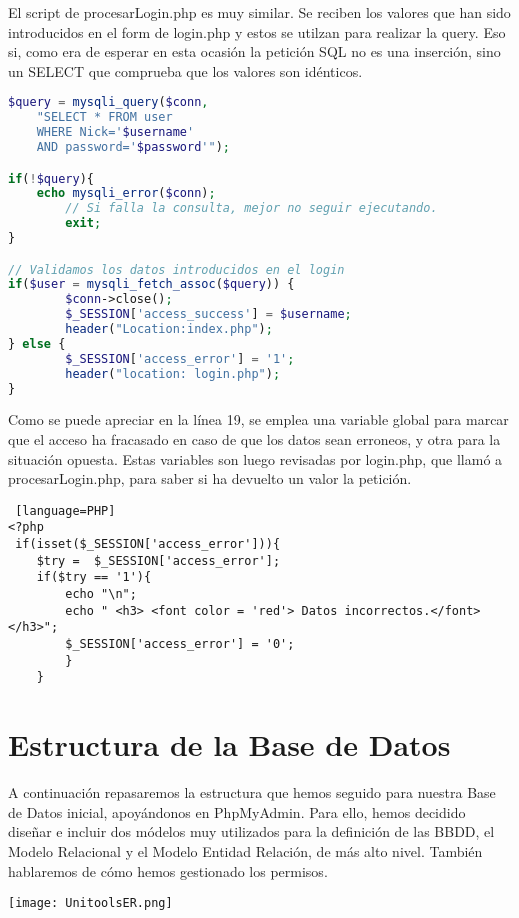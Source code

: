 \documentclass[12pt]{report}
\begin{document}
El script de procesarLogin.php es muy similar. Se reciben los valores que han sido introducidos en el form de login.php y estos se utilzan para realizar la query. Eso si, como era de esperar en esta ocasión la petición SQL no es una inserción, sino un SELECT que comprueba que los valores son idénticos.
\newline
\begin{lstlisting}[language=PHP]
$query = mysqli_query($conn, 
    "SELECT * FROM user 
    WHERE Nick='$username' 
    AND password='$password'");

if(!$query){ 
    echo mysqli_error($conn);
        // Si falla la consulta, mejor no seguir ejecutando.
        exit;
} 

// Validamos los datos introducidos en el login
if($user = mysqli_fetch_assoc($query)) {
        $conn->close();
        $_SESSION['access_success'] = $username;
        header("Location:index.php");
} else {
        $_SESSION['access_error'] = '1';
        header("location: login.php");
}
\end{lstlisting}

Como se puede apreciar en la línea 19, se emplea una variable global para marcar que el acceso ha fracasado en caso de que los datos sean erroneos, y otra para la situación opuesta. Estas variables son luego revisadas por login.php, que llamó a procesarLogin.php, para saber si ha devuelto un valor la petición.
\newline
\begin{lstlisting} [language=PHP]
<?php
 if(isset($_SESSION['access_error'])){
    $try =  $_SESSION['access_error'];
    if($try == '1'){
        echo "\n";
        echo " <h3> <font color = 'red'> Datos incorrectos.</font> </h3>";
        $_SESSION['access_error'] = '0';
        }
    }
\end{lstlisting}

\newpage
\section{Estructura de la Base de Datos}
A continuación repasaremos la estructura que hemos seguido para nuestra Base de Datos inicial, apoyándonos en PhpMyAdmin. Para ello, hemos decidido diseñar e incluir dos módelos muy utilizados para la definición de las BBDD, el Modelo Relacional y el Modelo Entidad Relación, de más alto nivel. También hablaremos de cómo hemos gestionado los permisos.
\newline


\texttt{[image: UnitoolsER.png]}
\end{document}
